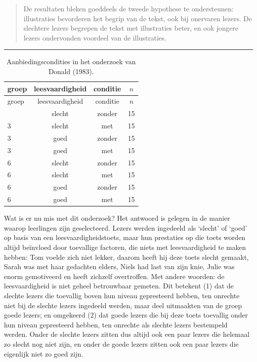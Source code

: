 \documentclass[
]{book}
\begin{document}
\begin{quote}
De resultaten bleken goeddeels de tweede hypothese te ondersteunen:
illustraties bevorderen het begrip van de tekst, ook bij onervaren
lezers. De slechtere lezers begrepen de tekst met illustraties beter, en
ook jongere lezers ondervonden voordeel van de illustraties.
\end{quote}

\begin{center}\rule{0.5\linewidth}{0.5pt}\end{center}

\begin{longtable}[]{@{}lccc@{}}
\caption{\label{tab:designDona83} Aanbiedingscondities in het onderzoek van Donald (1983).}\tabularnewline
\toprule\noalign{}
groep & leesvaardigheid & conditie & \(n\) \\
\midrule\noalign{}
\endfirsthead
\toprule\noalign{}
groep & leesvaardigheid & conditie & \(n\) \\
\midrule\noalign{}
\endhead
\bottomrule\noalign{}
\endlastfoot
3 & slecht & zonder & 15 \\
3 & slecht & met & 15 \\
3 & goed & zonder & 15 \\
3 & goed & met & 15 \\
6 & slecht & zonder & 15 \\
6 & slecht & met & 15 \\
6 & goed & zonder & 15 \\
6 & goed & met & 15 \\
\end{longtable}

Wat is er nu mis met dit onderzoek? Het antwoord is gelegen in de manier
waarop leerlingen zijn geselecteerd. Lezers werden ingedeeld als
`slecht' of `goed' op basis van een leesvaardigheidstoets, maar hun
prestaties op die toets worden altijd beïnvloed door toevallige
factoren, die niets met leesvaardigheid te maken hebben: Tom voelde zich
niet lekker, daarom heeft hij deze toets slecht gemaakt, Sarah was met
haar gedachten elders, Niels had last van zijn knie, Julie was enorm
gemotiveerd en heeft zichzelf overtroffen. Met andere woorden: de
leesvaardigheid is niet geheel betrouwbaar gemeten. Dit betekent (1) dat
de slechte lezers die toevallig boven hun niveau gepresteerd hebben, ten
onrechte niet bij de slechte lezers ingedeeld werden, maar deel
uitmaakten van de groep goede lezers; en omgekeerd (2) dat goede lezers
die bij deze toets toevallig onder hun niveau gepresteerd hebben, ten
onrechte als slechte lezers bestempeld werden. Onder de slechte lezers
zitten dus altijd ook een paar lezers die helemaal zo slecht nog niet
zijn, en onder de goede lezers zitten ook een paar lezers die eigenlijk
niet zo goed zijn.
\end{document}
